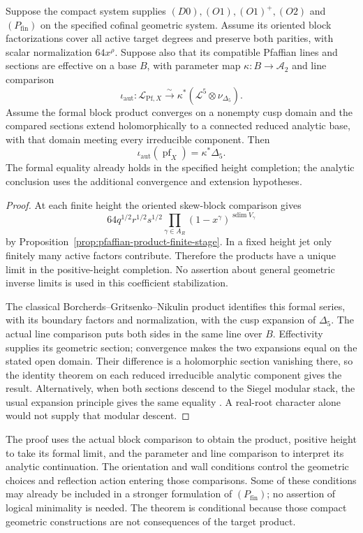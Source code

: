 \begin{theorem}
\label{thm:ch6-pfaffian-dirac}
Suppose the compact system supplies \((D0),(O1),(O1)^+,(O2)\) and
\((P_{\mathrm{fin}})\) on the specified cofinal geometric system.
Assume its oriented block factorizations cover all active target
degrees and preserve both parities, with scalar normalization
\(64x^\rho\).  Suppose also that its compatible Pfaffian lines and
sections are effective on a base \(B\), with parameter map
\(\kappa:B\to\mathcal A_2\) and line comparison
\[
 \iota_{\mathrm{aut}}:\mathscr L_{\mathrm{Pf},X}
 \xrightarrow{\sim}\kappa^*(\mathcal L^5\otimes\nu_{\Delta_5}).
\]
Assume the formal block product converges on a nonempty cusp domain
and the compared sections extend holomorphically to a connected
reduced analytic base, with that domain meeting every irreducible component.
Then
\[
 \iota_{\mathrm{aut}}(\operatorname{pf}_X)=\kappa^*\Delta_5.
\]
The formal equality already holds in the specified height completion;
the analytic conclusion uses the additional convergence and extension
hypotheses.
\end{theorem}
\begin{proof}
At each finite height the oriented skew-block comparison gives
\[
 64q^{1/2}r^{1/2}s^{1/2}
 \prod_{\gamma\in A_R}(1-x^\gamma)^{\operatorname{sdim}V_\gamma}
\]
by Proposition~\ref{prop:pfaffian-product-finite-stage}.  In a fixed
height jet only finitely many active factors contribute.  Therefore
the products have a unique limit in the positive-height completion.
No assertion about general geometric inverse limits is used in this
coefficient stabilization.

The classical Borcherds--Gritsenko--Nikulin product identifies this
formal series, with its boundary factors and normalization, with the
cusp expansion of \(\Delta_5\).  The actual line comparison puts
both sides in the same line over \(B\).  Effectivity supplies its
geometric section; convergence makes the two expansions equal on
the stated open domain.  Their difference is a holomorphic section
vanishing there, so the identity theorem on each reduced irreducible
analytic component gives the result.  Alternatively, when both
sections descend to the Siegel modular stack, the usual expansion
principle gives the same equality \cite{Igusa1962,Igusa1964II}.
A real-root character alone
would not supply that modular descent.
\end{proof}

\begin{remark}
\label{rem:ch6-why-four}
The proof uses the actual block comparison to obtain the product,
positive height to take its formal limit, and the parameter and
line comparison to interpret its analytic continuation.  The
orientation and wall conditions control the geometric choices and
reflection action entering those comparisons.  Some of these
conditions may already be included in a stronger formulation of
\((P_{\mathrm{fin}})\); no assertion of logical minimality is
needed.  The theorem is conditional because those compact geometric
constructions are not consequences of the target product.
\end{remark}

